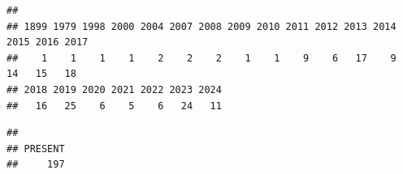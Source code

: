 \documentclass[
]{article}
\newenvironment{Shaded}{\begin{snugshade}}{\end{snugshade}}
\newcommand{\CommentTok}[1]{\textcolor[rgb]{0.56,0.35,0.01}{\textit{#1}}}
\newcommand{\FunctionTok}[1]{\textcolor[rgb]{0.13,0.29,0.53}{\textbf{#1}}}
\newcommand{\NormalTok}[1]{#1}
\newcommand{\SpecialCharTok}[1]{\textcolor[rgb]{0.81,0.36,0.00}{\textbf{#1}}}
\begin{document}
\begin{verbatim}
## 
## 1899 1979 1998 2000 2004 2007 2008 2009 2010 2011 2012 2013 2014 2015 2016 2017 
##    1    1    1    1    2    2    2    1    1    9    6   17    9   14   15   18 
## 2018 2019 2020 2021 2022 2023 2024 
##   16   25    6    5    6   24   11
\end{verbatim}

\begin{Shaded}
\end{Shaded}

\begin{verbatim}
## 
## PRESENT 
##     197
\end{verbatim}
\end{document}
